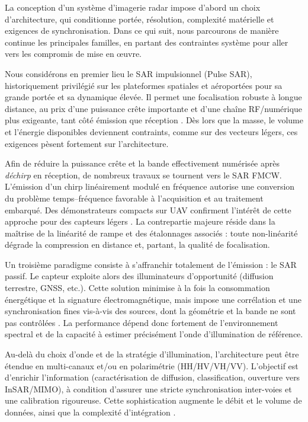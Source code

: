 \label{subsec:arch_sar}

La conception d’un système d’imagerie radar impose d’abord un choix d’architecture, qui conditionne portée, résolution, complexité matérielle et exigences de synchronisation. Dans ce qui suit, nous parcourons de manière continue les principales familles, en partant des contraintes système pour aller vers les compromis de mise en œuvre.

Nous considérons en premier lieu le SAR impulsionnel (Pulse SAR), historiquement privilégié sur les plateformes spatiales et aéroportées pour sa grande portée et sa dynamique élevée. Il permet une focalisation robuste à longue distance, au prix d’une puissance crête importante et d’une chaîne RF/numérique plus exigeante, tant côté émission que réception \cite{Krieger2010_InterferometricSAR}. Dès lors que la masse, le volume et l’énergie disponibles deviennent contraints, comme sur des vecteurs légers, ces exigences pèsent fortement sur l’architecture.

Afin de réduire la puissance crête et la bande effectivement numérisée après \textit{déchirp} en réception, de nombreux travaux se tournent vers le SAR FMCW. L’émission d’un chirp linéairement modulé en fréquence autorise une conversion du problème temps–fréquence favorable à l’acquisition et au traitement embarqué. Des démonstrateurs compacts sur UAV confirment l’intérêt de cette approche pour des capteurs légers \cite{Aguasca2013_ARBRES_UAV_SAR,Svedin2021_UAVSAR}. La contrepartie majeure réside dans la maîtrise de la linéarité de rampe et des étalonnages associés : toute non-linéarité dégrade la compression en distance et, partant, la qualité de focalisation.

Un troisième paradigme consiste à s’affranchir totalement de l’émission : le SAR passif. Le capteur exploite alors des illuminateurs d’opportunité (diffusion terrestre, GNSS, etc.). Cette solution minimise à la fois la consommation énergétique et la signature électromagnétique, mais impose une corrélation et une synchronisation fines vis-à-vis des sources, dont la géométrie et la bande ne sont pas contrôlées \cite{Sun2020_PassiveUAVSAR}. La performance dépend donc fortement de l’environnement spectral et de la capacité à estimer précisément l’onde d’illumination de référence.

Au-delà du choix d’onde et de la stratégie d’illumination, l’architecture peut être étendue en multi-canaux et/ou en polarimétrie (HH/HV/VH/VV). L’objectif est d’enrichir l’information (caractérisation de diffusion, classification, ouverture vers InSAR/MIMO), à condition d’assurer une stricte synchronisation inter-voies et une calibration rigoureuse. Cette sophistication augmente le débit et le volume de données, ainsi que la complexité d’intégration \cite{Krieger2010_InterferometricSAR}.

